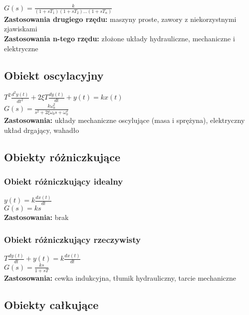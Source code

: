 \documentclass[11pt]{article}
\begin{document}
$G(s) = \frac{k}{(1 + sT_1)(1 + sT_2)...(1 + sT_n)}$\\

\textbf{Zastosowania drugiego rzędu:} maszyny proste, zawory z niekorzystnymi zjawiskami\\
\textbf{Zastosowania n-tego rzędu:} złożone układy hydrauliczne, mechaniczne i elektryczne

\subsection{Obiekt oscylacyjny}

$
T^2 \frac{d^2 y(t)}{dt^2} +
2 \xi T \frac{dy(t)}{dt} + y(t) =
k x(t)
$\\

$G(s) = \frac{k \omega_0^2 }{s^2 + 2 \xi \omega_0 s + \omega_0^2}$\\

\textbf{Zastosowania:} układy mechaniczne oscylujące (masa i sprężyna), elektryczny układ drgający, wahadło

\subsection{Obiekty różniczkujące}

\subsubsection{Obiekt różniczkujący idealny}

$y(t) = k \frac{dx(t)}{dt}$\\

$G(s) = ks$\\

\textbf{Zastosowania:} brak

\subsubsection{Obiekt różniczkujący rzeczywisty}

$T \frac{dy(t)}{dt} + y(t) = k \frac{dx(t)}{dt}$\\

$G(s) = \frac{ks}{1 + sT}$\\

\textbf{Zastosowania:} cewka indukcyjna, tłumik hydrauliczny, tarcie mechaniczne


\subsection{Obiekty całkujące}
\end{document}
